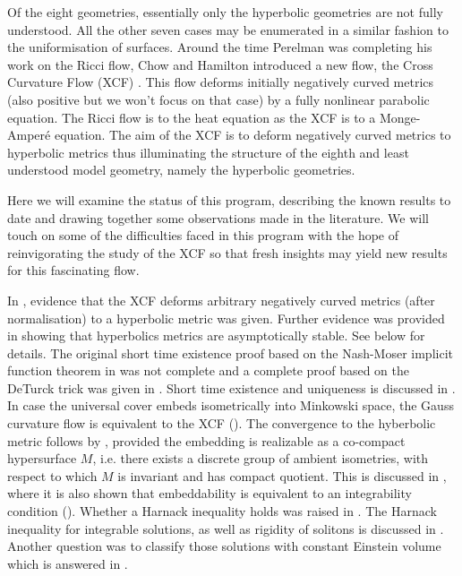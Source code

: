\documentclass[a4paper,12pt]{amsart}
\begin{document}
Of the eight geometries, essentially only the hyperbolic geometries are not fully understood. All the other seven cases may be enumerated in a similar fashion to the uniformisation of surfaces. Around the time Perelman was completing his work on the Ricci flow, Chow and Hamilton introduced a new flow, the Cross Curvature Flow (XCF) \cite{MR2055396}. This flow deforms initially negatively curved metrics (also positive but we won't focus on that case) by a fully nonlinear parabolic equation. The Ricci flow is to the heat equation as the XCF is to a Monge-Amper\'e equation. The aim of the XCF is to deform negatively curved metrics to hyperbolic metrics thus illuminating the structure of the eighth and least understood model geometry, namely the hyperbolic geometries.

Here we will examine the status of this program, describing the known results to date and drawing together some observations made in the literature. We will touch on some of the difficulties faced in this program with the hope of reinvigorating the study of the XCF so that fresh insights may yield new results for this fascinating flow.

In \cite{MR2055396}, evidence that the XCF deforms arbitrary negatively curved metrics (after normalisation) to a hyperbolic metric was given. Further evidence was provided in \cite{MR2448593} showing that hyperbolics metrics are asymptotically stable. See  below for details. The original short time existence proof based on the Nash-Moser implicit function theorem in \cite{MR2055396} was not complete and a complete proof based on the DeTurck trick was given in \cite{MR2207496}. Short time existence and uniqueness is discussed in . In case the universal cover embeds isometrically into Minkowski space, the Gauss curvature flow is equivalent to the XCF (). The convergence to the hyberbolic metric follows by \cite{MR3344442}, provided the embedding is realizable as a co-compact hypersurface $M$, i.e. there exists a discrete group of ambient isometries, with respect to which $M$ is invariant and has compact quotient. This is discussed in , where it is also shown that embeddability is equivalent to an integrability condition (). Whether a Harnack inequality holds was raised in \cite{MR2055396}. The Harnack inequality for integrable solutions, as well as rigidity of solitons is discussed in . Another question was to classify those solutions with constant Einstein volume which is answered in .
\end{document}
